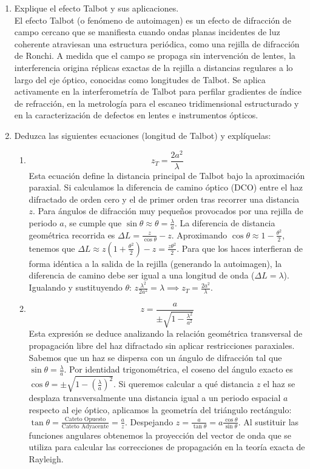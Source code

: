 \documentclass[12pt,a4paper]{article}
\begin{document}
\begin{enumerate}
		\item Explique el efecto Talbot y sus aplicaciones.\\
		El efecto Talbot (o fenómeno de autoimagen) es un efecto de difracción de campo cercano que se manifiesta cuando ondas planas incidentes de luz coherente atraviesan una estructura periódica, como una rejilla de difracción de Ronchi. A medida que el campo se propaga sin intervención de lentes, la interferencia origina réplicas exactas de la rejilla a distancias regulares a lo largo del eje óptico, conocidas como longitudes de Talbot. Se aplica activamente en la interferometría de Talbot para perfilar gradientes de índice de refracción, en la metrología para el escaneo tridimensional estructurado y en la caracterización de defectos en lentes e instrumentos ópticos.
		
		\item Deduzca las siguientes ecuaciones (longitud de Talbot) y explíquelas:
		\begin{enumerate}
			\item \[ z_T = \frac{2a^2}{\lambda} \]
			Esta ecuación define la distancia principal de Talbot bajo la aproximación paraxial. Si calculamos la diferencia de camino óptico (DCO) entre el haz difractado de orden cero y el de primer orden tras recorrer una distancia $z$. Para ángulos de difracción muy pequeños provocados por una rejilla de periodo $a$, se cumple que $\sin\theta \approx \theta = \frac{\lambda}{a}$. La diferencia de distancia geométrica recorrida es $\Delta L = \frac{z}{\cos\theta} - z$. Aproximando $\cos\theta \approx 1 - \frac{\theta^2}{2}$, tenemos que $\Delta L \approx z(1 + \frac{\theta^2}{2}) - z = \frac{z\theta^2}{2}$. Para que los haces interfieran de forma idéntica a la salida de la rejilla (generando la autoimagen), la diferencia de camino debe ser igual a una longitud de onda ($\Delta L = \lambda$). Igualando y sustituyendo $\theta$: $z \frac{\lambda^2}{2a^2} = \lambda \implies z_T = \frac{2a^2}{\lambda}$.
			
			\item \[ z = \frac{a}{\pm \sqrt{1 - \frac{\lambda^2}{a^2}}} \]
			Esta expresión se deduce analizando la relación geométrica transversal de propagación libre del haz difractado sin aplicar restricciones paraxiales. Sabemos que un haz se dispersa con un ángulo de difracción tal que $\sin\theta = \frac{\lambda}{a}$. Por identidad trigonométrica, el coseno del ángulo exacto es $\cos\theta = \pm\sqrt{1 - (\frac{\lambda}{a})^2}$. Si queremos calcular a qué distancia $z$ el haz se desplaza transversalmente una distancia igual a un periodo espacial $a$ respecto al eje óptico, aplicamos la geometría del triángulo rectángulo: $\tan\theta = \frac{\text{Cateto Opuesto}}{\text{Cateto Adyacente}} = \frac{a}{z}$. Despejando $z = \frac{a}{\tan\theta} = a \frac{\cos\theta}{\sin\theta}$. Al sustituir las funciones angulares obtenemos la proyección del vector de onda que se utiliza para calcular las correcciones de propagación en la teoría exacta de Rayleigh.
		\end{enumerate}
		

\end{enumerate}
\end{document}
